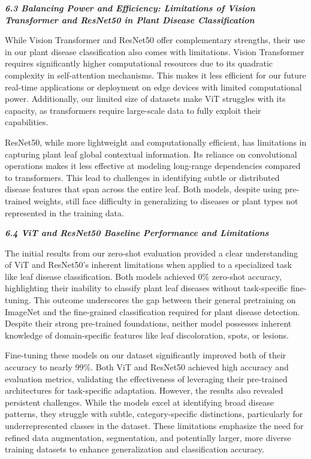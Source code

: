\documentclass{article}
\begin{document}
\textbf{\textit{6.3 Balancing Power and Efficiency: Limitations of Vision Transformer and ResNet50 in Plant Disease Classification}}

While Vision Transformer and ResNet50 offer complementary strengths, their use in our plant disease classification also comes with limitations. Vision Transformer requires significantly higher computational resources due to its quadratic complexity in self-attention mechanisms. This makes it less efficient for our future real-time applications or deployment on edge devices with limited computational power. Additionally, our limited size of datasets make ViT struggles with its capacity, as transformers require large-scale data to fully exploit their capabilities.

ResNet50, while more lightweight and computationally efficient, has limitations in capturing plant leaf global contextual information. Its reliance on convolutional operations makes it less effective at modeling long-range dependencies compared to transformers. This lead to challenges in identifying subtle or distributed disease features that span across the entire leaf. Both models, despite using pre-trained weights, still face difficulty in generalizing to diseases or plant types not represented in the training data.


\textbf{\textit{6.4 ViT and ResNet50 Baseline Performance and Limitations}}

The initial results from our zero-shot evaluation provided a clear understanding of ViT and ResNet50’s inherent limitations when applied to a specialized task like leaf disease classification. Both models achieved 0\% zero-shot accuracy, highlighting their inability to classify plant leaf diseases without task-specific fine-tuning. This outcome underscores the gap between their general pretraining on ImageNet and the fine-grained classification required for plant disease detection. Despite their strong pre-trained foundations, neither model possesses inherent knowledge of domain-specific features like leaf discoloration, spots, or lesions.

Fine-tuning these models on our dataset significantly improved both of their accuracy to nearly 99\%. Both ViT and ResNet50 achieved high accuracy and evaluation metrics, validating the effectiveness of leveraging their pre-trained architectures for task-specific adaptation. However, the results also revealed persistent challenges. While the models excel at identifying broad disease patterns, they struggle with subtle, category-specific distinctions, particularly for underrepresented classes in the dataset. These limitations emphasize the need for refined data augmentation, segmentation, and potentially larger, more diverse training datasets to enhance generalization and classification accuracy.
\end{document}
